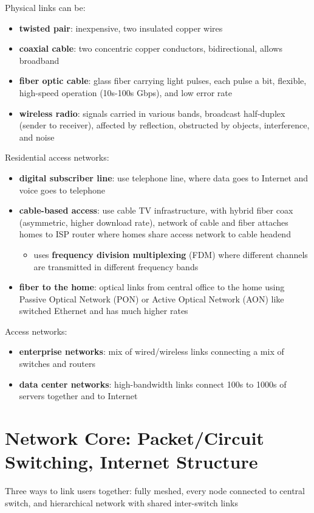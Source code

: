 \documentclass[11pt]{article}
\begin{document}
Physical links can be:
\begin{itemize}
\item \textbf{twisted pair}: inexpensive, two insulated copper wires
\item \textbf{coaxial cable}: two concentric copper conductors, bidirectional, allows broadband
\item \textbf{fiber optic cable}: glass fiber carrying light pulses, each pulse a bit, flexible, high-speed
operation (10s-100s Gbps), and low error rate
\item \textbf{wireless radio}: signals carried in various bands, broadcast half-duplex (sender to receiver),
affected by reflection, obstructed by objects, interference, and noise
\end{itemize}

Residential access networks:
\begin{itemize}
\item \textbf{digital subscriber line}: use telephone line, where data goes to Internet and voice goes to telephone
\item \textbf{cable-based access}: use cable TV infrastructure, with hybrid fiber coax (asymmetric, higher download
rate), network of cable and fiber attaches homes to ISP router where homes share access network
to cable headend
\begin{itemize}
\item uses \textbf{frequency division multiplexing} (FDM) where different channels are transmitted in different
frequency bands
\end{itemize}
\item \textbf{fiber to the home}: optical links from central office to the home using Passive Optical Network (PON)
or Active Optical Network (AON) like switched Ethernet and has much higher rates
\end{itemize}

Access networks:
\begin{itemize}
\item \textbf{enterprise networks}: mix of wired/wireless links connecting a mix of switches and routers
\item \textbf{data center networks}: high-bandwidth links connect 100s to 1000s of servers together and to Internet
\end{itemize}
\section{Network Core: Packet/Circuit Switching, Internet Structure}
\label{sec:org4d85718}
Three ways to link users together: fully meshed, every node connected to central switch, and hierarchical
network with shared inter-switch links
\end{document}

